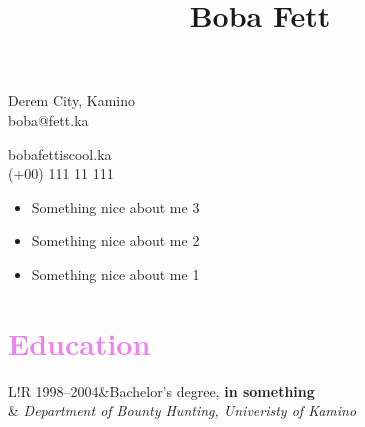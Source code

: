 \documentclass[8pt]{article}
\title{\Huge Boba Fett}
\date{} %
\newcommand\mycolor{violet}
\newcommand\VRule{\color{\mycolor}\vrule width 0.7pt}
\begin{document}
\begin{minipage}{0.65\textwidth}
\begingroup
\let\center\flushleft
\let\endcenter\endflushleft
\maketitle
\endgroup
\end{minipage}
\begin{minipage}{0.4\textwidth}
\vspace{2cm}
\flushright{}
\end{minipage}


\vspace{-2cm}
\begin{minipage}{0.4\textwidth}
\noindent \Letter \hspace{2 mm} Derem City, Kamino\\
\MVAt \hspace{2 mm} boba@fett.ka\\
\end{minipage}
\begin{minipage}{0.7\textwidth}
bobafettiscool.ka\\
\Mobilefone \hspace{2 mm} (+00) 111 11 111
\end{minipage}


\vspace{2.2cm}
\begin{itemize}
\item
Something nice about me 3
\item
\vspace{-1.2cm}
Something nice about me 2
\item
\vspace{-1.2cm}
Something nice about me 1
\end{itemize}

\vspace{0.6cm}

\section*{\textcolor{\mycolor}{\large{Education}}}
\begin{tabular}{L!{\VRule}R}
1998--2004&Bachelor's degree, { \bf in something}\\ & { \it Department of Bounty Hunting, Univeristy of Kamino}\\
\end{tabular}
 
\end{document}
